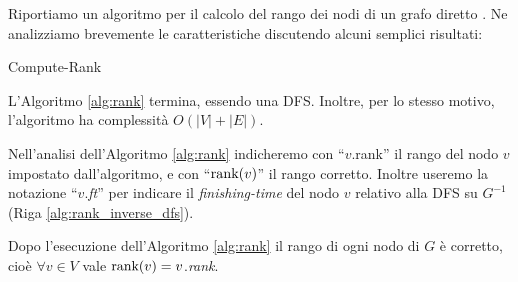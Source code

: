 Riportiamo un algoritmo per il calcolo del rango dei nodi di un grafo diretto \cite{dovier}. Ne analizziamo brevemente le caratteristiche discutendo alcuni semplici risultati:
\begin{algorithm}[t!]
    \caption{Compute-Rank}
    \label{alg:rank}
\end{algorithm}

\begin{observation}
    L'Algoritmo \ref{alg:rank} termina, essendo una DFS. Inoltre, per lo stesso motivo, l'algoritmo ha complessità $O(|V| + |E|)$.
\end{observation}
Nell'analisi dell'Algoritmo \ref{alg:rank} indicheremo con ``$v$.rank'' il rango del nodo $v$ impostato dall'algoritmo, e con ``$\textup{rank}(v)$'' il rango corretto. Inoltre useremo la notazione ``$v$.\emph{ft}'' per indicare il \emph{finishing-time} del nodo $v$ relativo alla DFS su $G^{-1}$ (Riga \ref{alg:rank_inverse_dfs}).
\begin{theorem}
    \label{theo:rank_correct}
    Dopo l'esecuzione dell'Algoritmo \ref{alg:rank} il rango di ogni nodo di $G$ è corretto, cioè $\forall v \in V$ vale $\textup{rank}(v) = v$.\emph{rank}.
\end{theorem}

